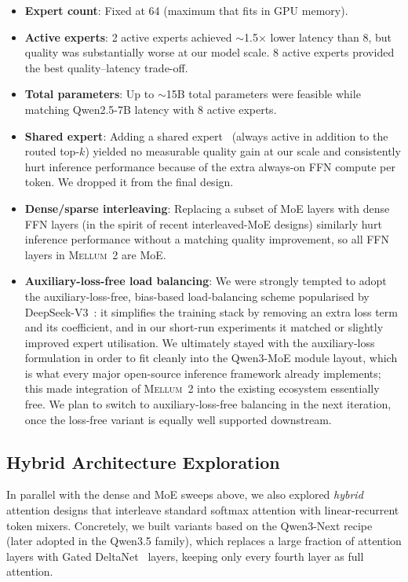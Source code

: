 \documentclass[11pt,a4paper]{article}
\newcommand{\modelname}{\textsc{Mellum~2}\xspace}
\begin{document}
\begin{itemize}
  \item \textbf{Expert count}: Fixed at 64 (maximum that fits in GPU memory).
  \item \textbf{Active experts}: 2 active experts achieved ${\sim}$1.5$\times$
    lower latency than 8, but quality was substantially worse at our model
    scale. 8 active experts provided the best quality--latency trade-off.
  \item \textbf{Total parameters}: Up to ${\sim}$15B total parameters were
    feasible while matching Qwen2.5-7B latency with 8 active experts.
  \item \textbf{Shared expert}: Adding a shared expert~\cite{dai2024deepseekmoe} (always active in
    addition to the routed top-$k$) yielded no measurable quality gain at our
    scale and consistently hurt inference performance because of the extra
    always-on FFN compute per token. We dropped it from the final design.
  \item \textbf{Dense/sparse interleaving}: Replacing a subset of MoE layers
    with dense FFN layers (in the spirit of recent
    interleaved-MoE designs) similarly hurt inference performance without a
    matching quality improvement, so all FFN layers in \modelname{} are MoE.
  \item \textbf{Auxiliary-loss-free load balancing}: We were strongly tempted
    to adopt the auxiliary-loss-free, bias-based load-balancing scheme
    popularised by DeepSeek-V3~\cite{deepseekai2025deepseekv3}: it simplifies
    the training stack by removing an extra loss term and its coefficient,
    and in our short-run experiments it matched or slightly improved expert
    utilisation. We ultimately stayed with the auxiliary-loss formulation in
    order to fit cleanly into the Qwen3-MoE module layout, which is what
    every major open-source inference framework already implements; this made
    integration of \modelname{} into the existing ecosystem essentially
    free. We plan to switch to auxiliary-loss-free balancing in the next
    iteration, once the loss-free variant is equally well supported
    downstream.
\end{itemize}

\subsection{Hybrid Architecture Exploration}
\label{app:hybrid-arch}

In parallel with the dense and MoE sweeps above, we also explored
\emph{hybrid} attention designs that interleave standard softmax attention
with linear-recurrent token mixers. Concretely, we built variants based on
the Qwen3-Next recipe~\cite{qwen2026qwen35} (later adopted in the Qwen3.5
family), which replaces a large fraction of attention layers with Gated
DeltaNet~\cite{yang2025gateddeltanet} layers, keeping only every fourth
layer as full attention.
\end{document}
